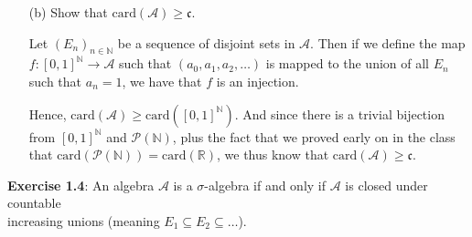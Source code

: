 \documentclass{book}
\newcommand{\exTwoP}{%
   \color{RedViolet}%
   \fontsize{13}{15}\selectfont%
}
\newenvironment{myIndent}{%
   \begin{adjustwidth}{2.5em}{0em}%
}{%
   \end{adjustwidth}%
}
\newcommand{\blab}[1]{\textbf{#1}}
\newcommand{\card}{\mathrm{card}}
\newcommand{\retTwo}{\hfill\bigbreak}
\begin{document}
\begin{itemize}
\begin{myIndent}
      By transitivity, we know that $A_{k-1} \cup B$ is comparable via proper subset with $A_i$ for all $i \in \{1, \ldots, n\}$. Hence, we've shown that $\mathcal{S} \cup \{A_{k-1} \cup B\}$ is a sequence of sets in $\mathcal{A}$ simply ordered by proper subset. But this contradicts that $\mathcal{S}$ is maximal.\retTwo

      Now that we know $\mathcal{S}$ is infinite, let $(E_n)_{n \in \mathbb{Z}_+}$ be a sequence of sets in $\mathcal{S}$\\ satisfying that $E_n \subset E_{n + 1}$. Then we have that $(E_{n+1} - E_n)_{n \in \mathbb{Z}_+}$ is an infinite\\ sequence of disjoint sets in $\mathcal{A}$.\retTwo
   \end{myIndent}

   \item[(b)] Show that $\card(\mathcal{A}) \geq \mathfrak{c}$.
   
   \begin{myIndent}\exTwoP
      Let $(E_n)_{n \in \mathbb{N}}$ be a sequence of disjoint sets in $\mathcal{A}$. Then if we define the map\\ [2pt] $f: [0, 1]^\mathbb{N} \longrightarrow \mathcal{A}$ such that $(a_0, a_1, a_2, \ldots)$ is mapped to the union of all $E_n$\\ [2pt] such that $a_n = 1$, we have that $f$ is an injection.\retTwo

      Hence, $\card(\mathcal{A}) \geq \card([0, 1]^{\mathbb{N}})$. And since there is a trivial bijection\\ from $[0, 1]^{\mathbb{N}}$ and $\mathcal{P}(\mathbb{N})$, plus the fact that we proved early on in the class\\ that $\card(\mathcal{P}(\mathbb{N})) = \card(\mathbb{R})$, we thus know that $\card(\mathcal{A}) \geq \mathfrak{c}$.\newpage
   \end{myIndent}
\end{itemize}

\blab{Exercise 1.4}: An algebra $\mathcal{A}$ is a $\sigma$-algebra if and only if $\mathcal{A}$ is closed under countable\\ increasing unions (meaning $E_1 \subseteq E_2 \subseteq \ldots$).
\end{document}
